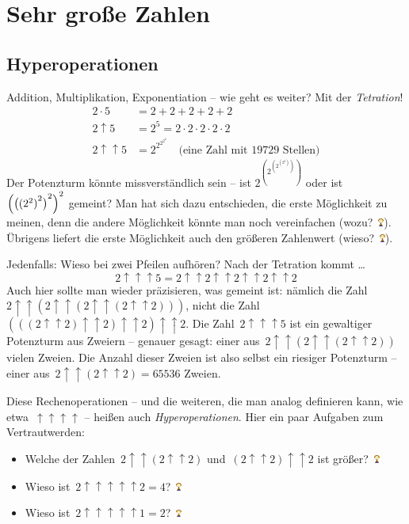 \documentclass{../../zirkelblatt1718}
\theoremstyle{definition}
\theoremstyle{plain}
\theoremstyle{remark}
\newcommand{\happy}{\includegraphics[height=0.7em]{happy}\xspace}
\begin{document}
\section{Sehr große Zahlen}

\subsection{Hyperoperationen}

Addition, Multiplikation, Exponentiation -- wie geht es weiter? Mit der
\emph{Tetration}!
\begin{align*}
  2 \cdot 5 &= 2 + 2 + 2 + 2 + 2 \\
  2 \uparrow 5 &= 2^5 = 2 \cdot 2 \cdot 2 \cdot 2 \cdot 2 \\
  2 \uparrow\uparrow 5 &= 2^{2^{2^{2^{2}}}} \quad
  \text{(eine Zahl mit 19729 Stellen)}
\end{align*}
Der Potenzturm könnte missverständlich sein -- ist
$2^{(2^{(2^{(2^2)})})}$ oder ist~${\Bigl({\bigl({(2^2)}^2\bigr)}^2\Bigr)}^2$ gemeint?
Man hat sich dazu entschieden, die erste Möglichkeit zu meinen, denn die andere
Möglichkeit könnte man noch vereinfachen (wozu?~\happy). Übrigens liefert die
erste Möglichkeit auch den größeren Zahlenwert (wieso?~\happy).

Jedenfalls: Wieso bei zwei Pfeilen aufhören? Nach der Tetration kommt \ldots
\[
  2 \uparrow\uparrow\uparrow 5 =
  2 \uparrow\uparrow 2 \uparrow\uparrow 2 \uparrow\uparrow 2 \uparrow\uparrow 2
\]
Auch hier sollte man wieder präzisieren, was gemeint ist: nämlich die Zahl~$2
\uparrow\uparrow (2 \uparrow\uparrow (2 \uparrow\uparrow (2 \uparrow\uparrow
2)))$, nicht die Zahl~$(((2 \uparrow\uparrow 2) \uparrow\uparrow 2)
\uparrow\uparrow 2) \uparrow\uparrow 2$. Die Zahl~$2 \uparrow\uparrow\uparrow
5$ ist ein gewaltiger Potenzturm aus Zweiern -- genauer gesagt: einer aus~$2
\uparrow\uparrow (2 \uparrow\uparrow (2 \uparrow\uparrow 2))$ vielen Zweien.
Die Anzahl dieser Zweien ist also selbst ein riesiger Potenzturm -- einer
aus~$2 \uparrow\uparrow (2 \uparrow\uparrow 2) = 65536$ Zweien.

Diese Rechenoperationen -- und die weiteren, die man analog definieren kann,
wie etwa~$\uparrow\uparrow\uparrow\uparrow$ -- heißen auch
\emph{Hyperoperationen}. Hier ein paar Aufgaben zum Vertrautwerden:

\begin{itemize}
  \item Welche der Zahlen~$2 \uparrow\uparrow (2 \uparrow\uparrow 2)$ und~$(2
  \uparrow\uparrow 2) \uparrow\uparrow 2$ ist größer?~\happy
  \item Wieso ist~$2 \uparrow\uparrow\uparrow\uparrow\uparrow 2 = 4$?~\happy
  \item Wieso ist~$2 \uparrow\uparrow\uparrow\uparrow\uparrow 1 = 2$?~\happy
\end{itemize}
\end{document}

